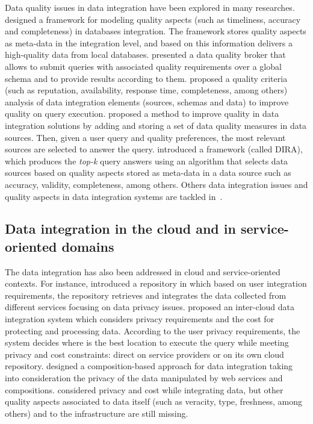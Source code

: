 Data quality issues in data integration have been explored in many researches. 
\cite{Gertz1998} designed a framework for modeling quality aspects
(such as timeliness, accuracy and completeness) in databases integration. The framework
stores quality aspects as meta-data in the integration level, and based on this information
delivers a high-quality data from local databases.
\cite{Scannapieco:2004} presented a data quality broker that allows to submit 
queries with associated quality requirements over a global schema and to 
provide results according to them.
\cite{Batista07} proposed a quality criteria (such as reputation, availability, 
response time, completeness, among others) analysis of data integration elements 
(sources, schemas and data) to improve quality on query execution. 
\cite{Moneim2015} proposed a method to improve quality in data integration solutions
by adding and storing a set of data quality measures in data sources. Then, given a 
user query and quality preferences, the most relevant sources are selected to answer
the query.
\cite{Monem2016} introduced a framework (called DIRA), which produces the \textit{top-k}
query answers using an algorithm that selects data sources based on quality aspects stored
as meta-data in a data source such as accuracy, validity, completeness, among others. 
Others data integration issues and quality aspects in data integration systems are tackled
in~\cite{Batini2006,Angeles2009,Boufares2012}. 


\subsection{Data integration in the cloud and in service-oriented domains}
The data integration has also been addressed in cloud and service-oriented contexts.
%
For instance, \cite{YauY08} introduced a repository in which based on user 
integration requirements, the repository retrieves and integrates the data
collected from different services focusing on data privacy issues. 
%
\cite{Tian2010} proposed an inter-cloud data integration system which considers 
privacy requirements and the cost for protecting and processing data. 
According to the user privacy requirements, the system decides where is the best
location to execute the query while meeting privacy and cost constraints:
direct on service providers or on its own cloud repository.
%
\cite{benslimane2013} designed a composition-based approach for data integration
taking into consideration the privacy of the data manipulated by web services and 
compositions.
%
\cite{YauY08,Tian2010,benslimane2013} considered privacy and cost while integrating data, but 
other quality aspects associated to data itself (such as veracity, type, freshness,
among others) and to the infrastructure are still missing.
%

